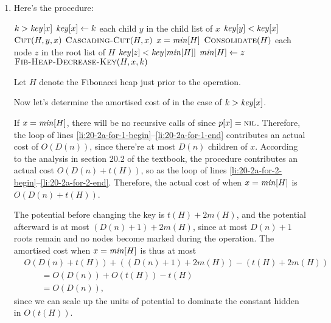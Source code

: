 \documentclass[a4paper, fleqn]{article}
\begin{document}
\begin{enumerate}
\renewcommand{\labelenumi}{\itshape \bfseries \alph{enumi}.}

\item  %

Here's the  procedure:

\begin{codebox}
\li \If $k > \id{key}[x]$
\li   \Then
        $\id{key}[x] \gets k$
\li     \For each child $y$ in the child list of $x$
	\label{li:20-2a-for-1-begin}
\li       \Do
	    \If $\id{key}[y] < \id{key}[x]$
\li           \Then
	        $\textnormal{\scshape Cut}(H, y, x)$
\li             $\textnormal{\scshape Cascading-Cut}(H, x)$
	      \End
	  \End
	\label{li:20-2a-for-1-end}
\li     \If $x = \id{min}[H]$
\li       \Then
            $\textnormal{\scshape Consolidate}(H)$
\li         \For each node $z$ in the root list of $H$
            \label{li:20-2a-for-2-begin}
\li           \Do
                \If $\id{key}[z] < \id{key}[\id{min}[H]]$
\li               \Then
                    $\id{min}[H] \gets z$
                  \End
              \End
            \label{li:20-2a-for-2-end}
          \End
\li   \Else
        $\textnormal{\scshape Fib-Heap-Decrease-Key}(H, x, k)$
      \End
\end{codebox}

Let $H$ denote the Fibonacci heap just prior to the
 operation.

Now let's determine the amortised cost of 
in the case of $k > \id{key}[x]$.

If $x = \id{min}[H]$, there will be no recursive calls of
 since $p[x] = \textnormal{\scshape nil}$. Therefore, the \For
loop of lines \ref{li:20-2a-for-1-begin}--\ref{li:20-2a-for-1-end}
contributes an actual cost of $O(D(n))$, since there're at most $D(n)$
children of $x$. According to the analysis in section 20.2 of the
textbook, the  procedure contributes an actual cost
$O(D(n) + t(H))$, so as the \For loop of lines
\ref{li:20-2a-for-2-begin}--\ref{li:20-2a-for-2-end}. Therefore, the
actual cost of  when $x = \id{min}[H]$ is
$O(D(n) + t(H))$.

The potential before changing the key is $t(H) + 2m(H)$, and the
potential afterward is at most $(D(n) + 1) + 2m(H)$, since at most
$D(n) + 1$ roots remain and no nodes become marked during the
operation. The amortised cost when $x = \id{min}[H]$ is thus at most
\begin{align*}
&O(D(n) + t(H)) + ((D(n) + 1) + 2m(H)) - (t(H) + 2m(H)) \\
&\qquad = O(D(n)) + O(t(H)) - t(H) \\
&\qquad = O(D(n)),
\end{align*}
since we can scale up the units of potential to dominate the constant
hidden in $O(t(H))$.


\end{enumerate}
\end{document}
